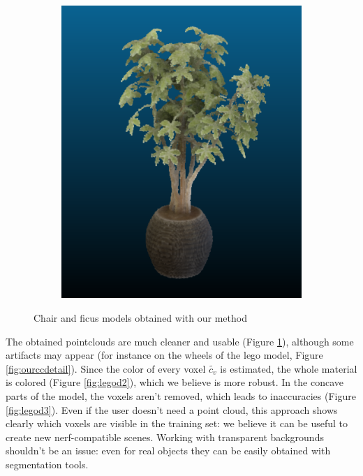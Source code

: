 \documentclass{article}
\begin{document}
\begin{figure}[!h]
\begin{subfigure}{.24\textwidth}
  \includegraphics[width=\linewidth]{figs/carve/ficusc.png}  
\end{subfigure}
     \caption{Chair and ficus models obtained with our method}
    \label{fig:cc2}
\end{figure}

The obtained pointclouds are much cleaner and usable (Figure \ref{fig:cc2}), although some artifacts may appear (for instance on the wheels of the lego model, Figure \ref{fig:ourccdetail}). Since the color of every voxel $\tilde{c_v}$ is estimated, the whole material is colored (Figure \ref{fig:legod2}), which we believe is more robust. In the concave parts of the model, the voxels aren't removed, which leads to inaccuracies (Figure \ref{fig:legod3}). Even if the user doesn't need a point cloud, this approach shows clearly which voxels are visible in the training set: we believe it can be useful to create new nerf-compatible scenes. Working with transparent backgrounds shouldn't be an issue: even for real objects they can be easily obtained with segmentation tools. 
\end{document}

